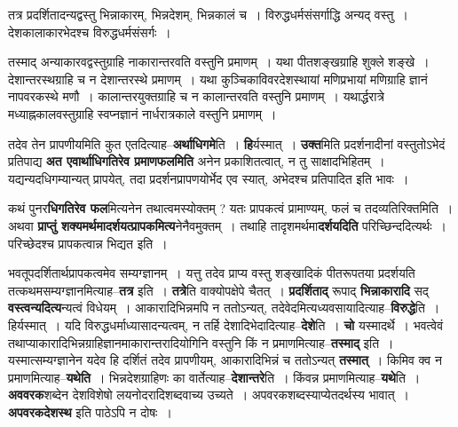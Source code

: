 \documentclass[article,12pt,a4paper]{memoir}
\begin{document}
	  \pstart तत्र प्रदर्शितादन्यद्वस्तु भिन्नाकारम्, भिन्नदेशम्, भिन्नकालं च । विरुद्धधर्मसंसर्गाद्धि अन्यद् वस्तु । देशकालाकारभेदश्च विरुद्धधर्मसंसर्गः ।
	\pend
        

	  \pstart तस्माद् अन्याकारवद्वस्तुग्राहि नाकारान्तरवति वस्तुनि प्रमाणम् । यथा पीतशङ्खग्राहि शुक्ले शङ्खे । देशान्तरस्थग्राहि च न देशान्तरस्थे प्रमाणम् । यथा कुञ्चिकाविवरदेशस्थायां मणिप्रभायां मणिग्राहि ज्ञानं नापवरकस्थे मणौ । कालान्तरयुक्तग्राहि च न कालान्तरवति वस्तुनि प्रमाणम् । यथार्द्धरात्रे मध्याह्नकालवस्तुग्राहि स्वप्नज्ञानं नार्धरात्रकाले वस्तुनि प्रमाणम् ।
	\pend
      
	  \endgroup
	

	  \pstart तदेव तेन प्रापणीयमिति कुत एतदित्याह--\textbf{अर्थाधिगमे}ति । \textbf{हि}र्यस्मात् । \textbf{उक्त}मिति प्रदर्शनादीनां वस्तुतोऽभेदं प्रतिपाद्य \textbf{अत एवार्थाधिगतिरेव प्रमाणफलमिति} अनेन प्रकाशितत्वात्, न तु साक्षादभिहितम् । यद्यन्यदधिगम्यान्यत् प्रापयेत्, तदा प्रदर्शनप्रापणयोर्भेद एव स्यात्, अभेदश्च प्रतिपादित इति भावः ।
	\pend
      

	  \pstart कथं पुनर\textbf{धिगतिरेव फल}मित्यनेन तथात्वमस्योक्तम् ? यतः प्रापकत्वं प्रामाण्यम्, फलं च तदव्यतिरिक्तमिति । अथवा \textbf{प्राप्तुं शक्यमर्थमादर्शयत्प्रापकमित्य}नेनैवमुक्तम् । तथाहि तादृशमर्थमा\textbf{दर्शयदिति} परिच्छिन्ददित्यर्थः । परिच्छेदश्च प्रापकत्वान्न भिद्यत इति ।
	\pend
      

	  \pstart भवतूपदर्शितार्थप्रापकत्वमेव सम्यग्ज्ञानम् । यत्तु तदेव प्राप्य वस्तु शङ्खादिकं पीतरूपतया प्रदर्शयति तत्कथमसम्यग्ज्ञानमित्याह--\textbf{तत्र} इति । \textbf{तत्रे}ति वाक्योपक्षेपे चैतत् । \textbf{प्रदर्शिताद्} रूपाद् \textbf{भिन्नाकारादि} सद् \textbf{वस्त्वन्यदित्य}न्यत्वं विधेयम् । आकारादिभिन्नमपि न ततोऽन्यत्, तदेवेदमित्यध्यवसायादित्याह--\textbf{विरुद्धे}ति । हिर्यस्मात् । यदि विरुद्धधर्माध्यासादन्यत्वम्, न तर्हि देशादिभेदादित्याह--\textbf{देशे}ति । \textbf{चो} यस्मादर्थे । भवत्वेवं तथाप्याकारादिभिन्नग्राहिज्ञानमाकारान्तरादियोगिनि वस्तुनि किं न प्रमाणमित्याह--\textbf{तस्माद्} इति । यस्मात्सम्यग्ज्ञानेन यदेव हि दर्शितं तदेव प्रापणीयम्, आकारादिभिन्नं च ततोऽन्यत् \textbf{तस्मात्} । किमिव क्व न प्रमाणमित्याह--\textbf{यथेति} । भिन्नदेशग्राहिणः का वार्तेत्याह--\textbf{देशान्तरे}ति । किंवन्न प्रमाणमित्याह--\textbf{यथे}ति । \textbf{अववरक}शब्देन देशविशेषो लयनोदरादिशब्दवाच्य उच्यते । अपवरकशब्दस्याप्येतदर्थस्य भावात् । \textbf{अपवरकदेशस्थ} इति पाठेऽपि न दोषः ।
	\pend
      
\end{document}
